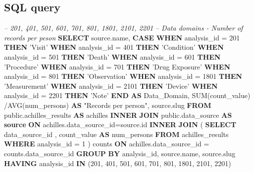 \documentclass[]{book}
\newenvironment{Shaded}{\begin{snugshade}}{\end{snugshade}}
\newcommand{\KeywordTok}[1]{\textcolor[rgb]{0.13,0.29,0.53}{\textbf{#1}}}
\newcommand{\DecValTok}[1]{\textcolor[rgb]{0.00,0.00,0.81}{#1}}
\newcommand{\StringTok}[1]{\textcolor[rgb]{0.31,0.60,0.02}{#1}}
\newcommand{\CommentTok}[1]{\textcolor[rgb]{0.56,0.35,0.01}{\textit{#1}}}
\newcommand{\OtherTok}[1]{\textcolor[rgb]{0.56,0.35,0.01}{#1}}
\newcommand{\FunctionTok}[1]{\textcolor[rgb]{0.00,0.00,0.00}{#1}}
\newcommand{\NormalTok}[1]{#1}
\begin{document}
\subsection{SQL query}\label{sql-query-18}

\begin{Shaded}
\begin{Highlighting}[]
\CommentTok{-- 201, 401, 501, 601, 701, 801, 1801, 2101, 2201   }
\CommentTok{-- Data domains - Number of records per peson}
\KeywordTok{SELECT} 
\NormalTok{    source.name,}
    \KeywordTok{CASE} 
      \KeywordTok{WHEN}\NormalTok{ analysis_id = }\DecValTok{201} \KeywordTok{THEN} \StringTok{'Visit'}
      \KeywordTok{WHEN}\NormalTok{ analysis_id = }\DecValTok{401} \KeywordTok{THEN} \StringTok{'Condition'}
      \KeywordTok{WHEN}\NormalTok{ analysis_id = }\DecValTok{501} \KeywordTok{THEN} \StringTok{'Death'}
      \KeywordTok{WHEN}\NormalTok{ analysis_id = }\DecValTok{601} \KeywordTok{THEN} \StringTok{'Procedure'}
      \KeywordTok{WHEN}\NormalTok{ analysis_id = }\DecValTok{701} \KeywordTok{THEN} \StringTok{'Drug Exposure'}
      \KeywordTok{WHEN}\NormalTok{ analysis_id = }\DecValTok{801} \KeywordTok{THEN} \StringTok{'Observation'}
      \KeywordTok{WHEN}\NormalTok{ analysis_id = }\DecValTok{1801} \KeywordTok{THEN} \StringTok{'Measurement'}
      \KeywordTok{WHEN}\NormalTok{ analysis_id = }\DecValTok{2101} \KeywordTok{THEN} \StringTok{'Device'}
      \KeywordTok{WHEN}\NormalTok{ analysis_id = }\DecValTok{2201} \KeywordTok{THEN} \StringTok{'Note'}
    \KeywordTok{END} \KeywordTok{AS}\NormalTok{ Data_Domain,}
    \FunctionTok{SUM}\NormalTok{(count_value) /AVG(num_persons) }\KeywordTok{AS} \OtherTok{"Records per person"}\NormalTok{,}
\NormalTok{    source.slug}
\KeywordTok{FROM}\NormalTok{ public.achilles_results }\KeywordTok{AS}\NormalTok{ achilles }
    \KeywordTok{INNER} \KeywordTok{JOIN}\NormalTok{ public.data_source }\KeywordTok{AS} \KeywordTok{source} \KeywordTok{ON} 
\NormalTok{      achilles.data_source_id=source.id}
    \KeywordTok{INNER} \KeywordTok{JOIN}\NormalTok{ (}
        \KeywordTok{SELECT}\NormalTok{ data_source_id , count_value }\KeywordTok{AS}\NormalTok{ num_persons }
        \KeywordTok{FROM}\NormalTok{ achilles_results }
        \KeywordTok{WHERE}\NormalTok{ analysis_id = }\DecValTok{1}
\NormalTok{        ) counts }\KeywordTok{ON} 
\NormalTok{      achilles.data_source_id = counts.data_source_id }
\KeywordTok{GROUP} \KeywordTok{BY}\NormalTok{ analysis_id, source.name, source.slug}
\KeywordTok{HAVING}\NormalTok{ analysis_id }\KeywordTok{IN}\NormalTok{ (}\DecValTok{201}\NormalTok{, }\DecValTok{401}\NormalTok{, }\DecValTok{501}\NormalTok{, }\DecValTok{601}\NormalTok{, }\DecValTok{701}\NormalTok{, }\DecValTok{801}\NormalTok{, }\DecValTok{1801}\NormalTok{, }\DecValTok{2101}\NormalTok{, }
    \DecValTok{2201}\NormalTok{)}
\end{Highlighting}
\end{Shaded}
\end{document}
